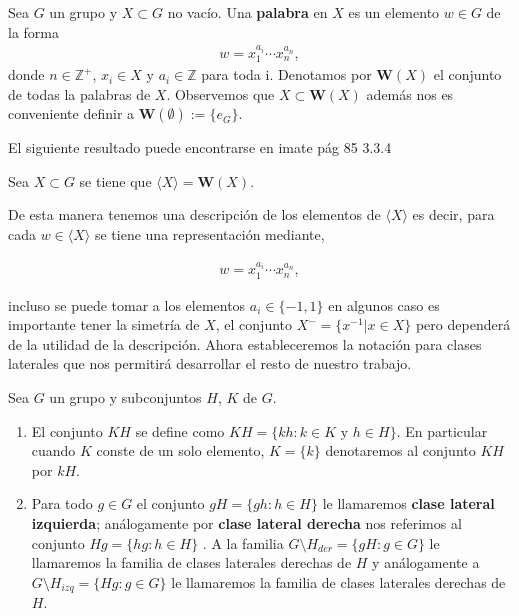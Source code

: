 \begin{df}
Sea $G$ un  grupo y $X \subset G$ no vacío. Una \textbf{palabra} en $X$ es un elemento $w \in G$ de la forma
\begin{align*}
w=x_1^{a_i} \cdots x_n^{a_n},
\end{align*}
donde $n \in \mathbb{Z}^+$, $x_i \in X$ y $a_i \in \mathbb{Z}$ para toda i. Denotamos por $\mathbf{W}(X)$ el conjunto de todas la palabras de  $X$. Observemos que $X \subset \mathbf{W}(X)$ además nos es conveniente definir a $\mathbf{W}(\emptyset) :=\{e_G\}$.
\end{df}

El siguiente resultado puede encontrarse en imate pág 85 3.3.4

\begin{te}
Sea $X \subset G$ se tiene que $\langle X \rangle= \mathbf{W}(X)$.
\end{te}

De esta manera tenemos una descripción de los elementos de $\langle X \rangle$ es decir, para cada $w \in \langle X \rangle$ se tiene una representación mediante, 

\begin{align*}
w=x_1^{a_i} \cdots x_n^{a_n},
\end{align*}

incluso se puede tomar a los elementos $a_i \in \{-1,1\}$ en algunos caso es importante tener la simetría de $X$, el conjunto $X^-=\{x^{-1}| x \in X \}$ pero dependerá de la utilidad de la descripción. Ahora estableceremos la notación para clases laterales que nos permitirá desarrollar el resto de nuestro trabajo. 	
	
\begin{df}
Sea $G$ un grupo y subconjuntos $H$, $K$ de $G$.

\begin{enumerate}
		
	\item El conjunto $KH$ se define como  $KH=\{kh: k \in K \text{ y } h \in H \}$. En particular cuando $K$ conste de un solo elemento, $K=\{k\}$ denotaremos al conjunto $KH$ por $kH$.	

	\item Para todo $g \in G$ el conjunto $gH=\{gh:h \in H \}$ le llamaremos \textbf{clase lateral izquierda}; análogamente por \textbf{clase lateral derecha} nos referimos al conjunto $Hg=\{hg:h \in H\}$ . A la familia  $G \setminus H_{der}=\{gH:g \in G\}$
le llamaremos la familia de clases laterales derechas de $H$ y análogamente a $G\setminus H_{izq}=\{Hg:g \in G\}$
le llamaremos la familia de clases laterales derechas de $H$. 
\end{enumerate} 
\end{df}	

